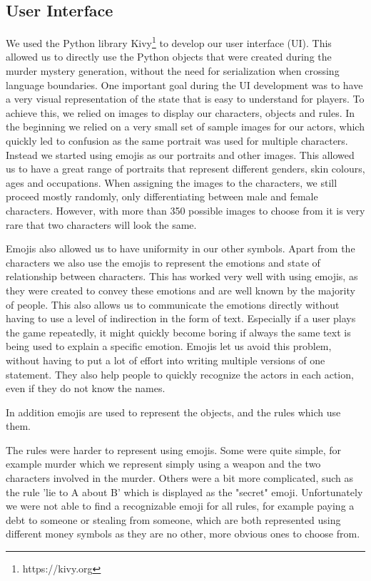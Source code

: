 \subsection{User Interface} \label{user_interface}

We used the Python library Kivy\footnote{https://kivy.org} to develop our user interface (UI).
This allowed us to directly use the Python objects that were created during the murder mystery generation, without the need for serialization when crossing language boundaries.
One important goal during the UI development was to have a very visual representation of the state that is easy to understand for players.
To achieve this, we relied on images to display our characters, objects and rules.
In the beginning we relied on a very small set of sample images for our actors, which quickly led to confusion as the same portrait was used for multiple characters.
Instead we started using emojis as our portraits and other images.
This allowed us to have a great range of portraits that represent different genders, skin colours, ages and occupations.
When assigning the images to the characters, we still proceed mostly randomly, only differentiating between male and female characters.
However, with more than 350 possible images to choose from it is very rare that two characters will look the same.

Emojis also allowed us to have uniformity in our other symbols.
Apart from the characters we also use the emojis to represent the emotions and state of relationship between characters.
This has worked very well with using emojis, as they were created to convey these emotions and are well known by the majority of people.
This also allows us to communicate the emotions directly without having to use a level of indirection in the form of text.
Especially if a user plays the game repeatedly, it might quickly become boring if always the same text is being used to explain a specific emotion.
Emojis let us avoid this problem, without having to put a lot of effort into writing multiple versions of one statement.
They also help people to quickly recognize the actors in each action, even if they do not know the names.

In addition emojis are used to represent the objects, and the rules which use them.

The rules were harder to represent using emojis.
Some were quite simple, for example murder which we represent simply using a weapon and the two characters involved in the murder.
Others were a bit more complicated, such as the rule 'lie to A about B' which is displayed as the "secret" emoji.
Unfortunately we were not able to find a recognizable emoji for all rules, for example paying a debt to someone or stealing from someone, which are both represented using different money symbols as they are no other, more obvious ones to choose from.
